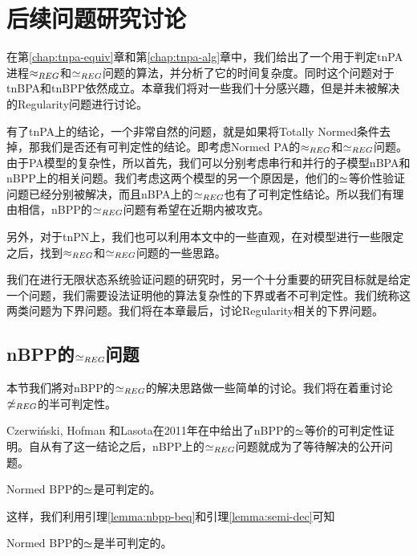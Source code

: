\chapter{后续问题研究讨论}
\label{chap:fut}

在第\ref{chap:tnpa-equiv}章和第\ref{chap:tnpa-alg}章中，我们给出了一个用于判定tnPA进程$\approx_{REG}$和$\simeq_{REG}$问题的算法，并分析了它的时间复杂度。同时这个问题对于tnBPA和tnBPP依然成立。本章我们将对一些我们十分感兴趣，但是并未被解决的Regularity问题进行讨论。

有了tnPA上的结论，一个非常自然的问题，就是如果将Totally Normed条件去掉，那我们是否还有可判定性的结论。即考虑Normed PA的$\approx_{REG}$和$\simeq_{REG}$问题。由于PA模型的复杂性，所以首先，我们可以分别考虑串行和并行的子模型nBPA和nBPP上的相关问题。我们考虑这两个模型的另一个原因是，他们的$\simeq$等价性验证问题已经分别被解决\cite{CzerwiAski2011,Fu2013}，而且nBPA上的$\simeq_{REG}$也有了可判定性结论\cite{Fu2013}。所以我们有理由相信，nBPP的$\simeq_{REG}$问题有希望在近期内被攻克。

另外，对于tnPN上，我们也可以利用本文中的一些直观，在对模型进行一些限定之后，找到$\approx_{REG}$和$\simeq_{REG}$问题的一些思路。

我们在进行无限状态系统验证问题的研究时，另一个十分重要的研究目标就是给定一个问题，我们需要设法证明他的算法复杂性的下界或者不可判定性。我们统称这两类问题为下界问题。我们将在本章最后，讨论Regularity相关的下界问题。

\section{nBPP的$\simeq_{REG}$问题}
\label{sec:nbpp}

本节我们將对nBPP的$\simeq_{REG}$的解决思路做一些简单的讨论。我们将在着重讨论$\not\simeq_{REG}$的半可判定性。

Czerwi{\'n}ski, Hofman 和Lasota在2011年在\cite{CzerwiAski2011}中给出了nBPP的$\simeq$等价的可判定性证明。自从有了这一结论之后，nBPP上的$\simeq_{REG}$问题就成为了等待解决的公开问题。

\begin{lem}\label{lemma:nbpp-beq}
Normed BPP的$\simeq$是可判定的。
\end{lem}

这样，我们利用引理\ref{lemma:nbpp-beq}和引理\ref{lemma:semi-dec}可知

\begin{cor}\label{cor:nbpp-beq-reg-semi}
Normed BPP的$\simeq$是半可判定的。
\end{cor}


